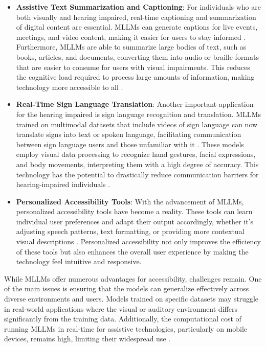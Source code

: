 \begin{itemize}
    \item \textbf{Assistive Text Summarization and Captioning}: For individuals who are both visually and hearing impaired, real-time captioning and summarization of digital content are essential. MLLMs can generate captions for live events, meetings, and video content, making it easier for users to stay informed \cite{vs2020ramesh}. Furthermore, MLLMs are able to summarize large bodies of text, such as books, articles, and documents, converting them into audio or braille formats that are easier to consume for users with visual impairments. This reduces the cognitive load required to process large amounts of information, making technology more accessible to all \cite{vs2023gomez}.

    \item \textbf{Real-Time Sign Language Translation}: Another important application for the hearing impaired is sign language recognition and translation. MLLMs trained on multimodal datasets that include videos of sign language can now translate signs into text or spoken language, facilitating communication between sign language users and those unfamiliar with it \cite{vs2024wang}. These models employ visual data processing to recognize hand gestures, facial expressions, and body movements, interpreting them with a high degree of accuracy. This technology has the potential to drastically reduce communication barriers for hearing-impaired individuals \cite{vs2024huang}.

    \item \textbf{Personalized Accessibility Tools}: With the advancement of MLLMs, personalized accessibility tools have become a reality. These tools can learn individual user preferences and adapt their output accordingly, whether it's adjusting speech patterns, text formatting, or providing more contextual visual descriptions \cite{vs2024song}. Personalized accessibility not only improves the efficiency of these tools but also enhances the overall user experience by making the technology feel intuitive and responsive.

\end{itemize}

While MLLMs offer numerous advantages for accessibility, challenges remain. One of the main issues is ensuring that the models can generalize effectively across diverse environments and users. Models trained on specific datasets may struggle in real-world applications where the visual or auditory environment differs significantly from the training data. Additionally, the computational cost of running MLLMs in real-time for assistive technologies, particularly on mobile devices, remains high, limiting their widespread use \cite{vs2023huang}.

